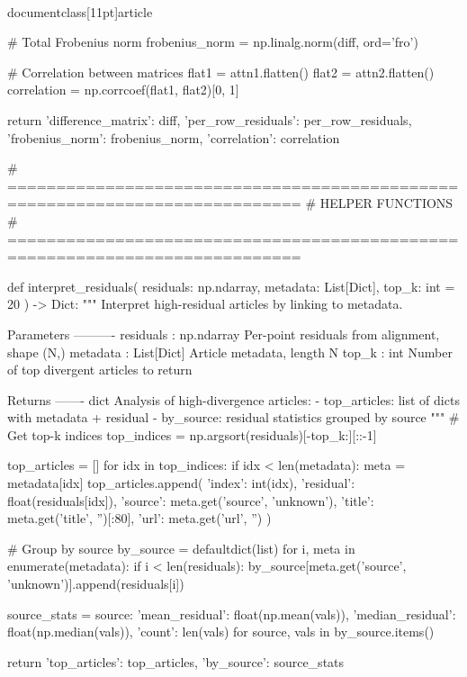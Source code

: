 \\documentclass[11pt]{article}
\begin{document}
\begin{CodeBlock}
    # Total Frobenius norm
    frobenius_norm = np.linalg.norm(diff, ord='fro')
    
    # Correlation between matrices
    flat1 = attn1.flatten()
    flat2 = attn2.flatten()
    correlation = np.corrcoef(flat1, flat2)[0, 1]
    
    return {
        'difference_matrix': diff,
        'per_row_residuals': per_row_residuals,
        'frobenius_norm': frobenius_norm,
        'correlation': correlation
    }


# ============================================================================
# HELPER FUNCTIONS
# ============================================================================

def interpret_residuals(
    residuals: np.ndarray,
    metadata: List[Dict],
    top_k: int = 20
) -> Dict:
    """
    Interpret high-residual articles by linking to metadata.
    
    Parameters
    ----------
    residuals : np.ndarray
        Per-point residuals from alignment, shape (N,)
    metadata : List[Dict]
        Article metadata, length N
    top_k : int
        Number of top divergent articles to return
    
    Returns
    -------
    dict
        Analysis of high-divergence articles:
        - top_articles: list of dicts with metadata + residual
        - by_source: residual statistics grouped by source
    """
    # Get top-k indices
    top_indices = np.argsort(residuals)[-top_k:][::-1]
    
    top_articles = []
    for idx in top_indices:
        if idx < len(metadata):
            meta = metadata[idx]
            top_articles.append({
                'index': int(idx),
                'residual': float(residuals[idx]),
                'source': meta.get('source', 'unknown'),
                'title': meta.get('title', '')[:80],
                'url': meta.get('url', '')
            })
    
    # Group by source
    by_source = defaultdict(list)
    for i, meta in enumerate(metadata):
        if i < len(residuals):
            by_source[meta.get('source', 'unknown')].append(residuals[i])
    
    source_stats = {
        source: {
            'mean_residual': float(np.mean(vals)),
            'median_residual': float(np.median(vals)),
            'count': len(vals)
        }
        for source, vals in by_source.items()
    }
    
    return {
        'top_articles': top_articles,
        'by_source': source_stats
    }
\end{CodeBlock}
\end{document}
